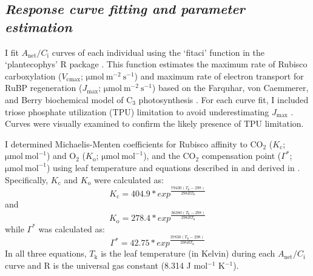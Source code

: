 \subsection{\textit{Response curve fitting and parameter estimation}}
\noindent I fit $A_\mathrm{net}/C_\mathrm{i}$ curves of each individual using the `fitaci' function in the `plantecophys' R package . This function estimates the maximum rate of Rubisco carboxylation ($V_\mathrm{cmax}$; $\mathrm{\mu mol\ m^{-2}\ s^{-1}}$) and maximum rate of electron transport for RuBP regeneration ($J_\mathrm{max}$; $\mathrm{\mu mol\ m^{-2}\ s^{-1}}$) based on the Farquhar, von Caemmerer, and Berry biochemical model of C$_{3}$ photosynthesis . For each curve fit, I included triose phosphate utilization (TPU) limitation to avoid underestimating $J_{\mathrm{max}}$ . Curves were visually examined to confirm the likely presence of TPU limitation. 
    
I determined Michaelis-Menten coefficients for Rubisco affinity to CO$_2$ ($K_\mathrm{c}$; $\mathrm{\mu mol\ mol^{-1}}$) and $\mathrm{O_2}$ ($K_\mathrm{o}$; $\mathrm{\mu mol\ mol^{-1}}$), and the CO$_2$ compensation point ($\Gamma^*$; $\mathrm{\mu mol\ mol^{-1}}$) using leaf temperature and equations described in  and derived in . Specifically, $K_\mathrm{c}$ and $K_\mathrm{o}$ were calculated as:
\begin{equation} \label{eq_2.3}
    K_\mathrm{c}=404.9*exp^{\frac{79430(T_\mathrm{k}-298)}{298RT_\mathrm{k}}}
\end{equation}  
\noindent and  
\begin{equation} \label{eq_2.4}
    K_\mathrm{o}=278.4*exp^{\frac{36380(T_\mathrm{k}-298)}{298RT_\mathrm{k}}}
\end{equation} 
\noindent while $\Gamma^*$ was calculated as: 
\begin{equation} \label{eq_2.5}
    \Gamma^\mathrm{*}=42.75*exp^{\frac{37830(T_\mathrm{k}-298)}{298RT_\mathrm{k}}}
\end{equation}
\noindent In all three equations, $T_\mathrm{k}$ is the leaf temperature (in Kelvin) during each $A_\mathrm{net}/C_\mathrm{i}$ curve and R is the universal gas constant (8.314 J mol$^{-1}$ K$^{-1}$).

